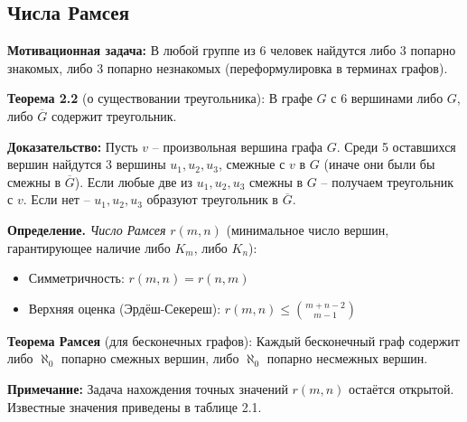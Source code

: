 \subsection{Числа Рамсея}

\noindent\textbf{Мотивационная задача:} В любой группе из 6 человек найдутся либо 3 попарно знакомых, либо 3 попарно незнакомых (переформулировка в терминах графов).

\noindent\textbf{Теорема 2.2} (о существовании треугольника): В графе $G$ с 6 вершинами либо $G$, либо $\overline{G}$ содержит треугольник.

\noindent\textbf{Доказательство:} 
Пусть $v$ -- произвольная вершина графа $G$. Среди 5 оставшихся вершин найдутся 3 вершины $u_1, u_2, u_3$, смежные с $v$ в $G$ (иначе они были бы смежны в $\overline{G}$). Если любые две из $u_1, u_2, u_3$ смежны в $G$ -- получаем треугольник с $v$. Если нет -- $u_1, u_2, u_3$ образуют треугольник в $\overline{G}$.

\noindent\textbf{Определение.} \textit{Число Рамсея} $r(m,n)$ (минимальное число вершин, гарантирующее наличие либо $K_m$, либо $K_n$):
\begin{itemize}[noitemsep,topsep=0pt]
\item Симметричность: $r(m,n) = r(n,m)$
\item Верхняя оценка (Эрдёш-Секереш): $r(m,n) \leq \binom{m + n - 2}{m - 1}$
\end{itemize}

\noindent\textbf{Теорема Рамсея} (для бесконечных графов): Каждый бесконечный граф содержит либо $\aleph_0$ попарно смежных вершин, либо $\aleph_0$ попарно несмежных вершин.

\noindent\textbf{Примечание:} Задача нахождения точных значений $r(m,n)$ остаётся открытой. Известные значения приведены в таблице 2.1.